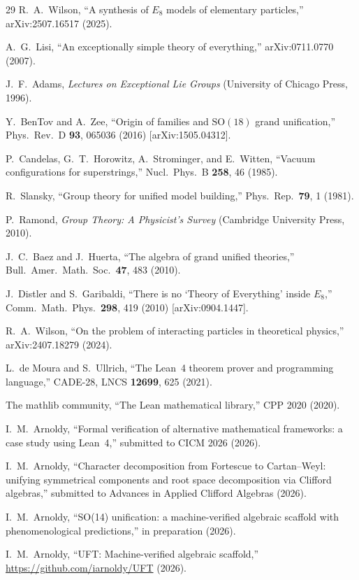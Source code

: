 \documentclass[aps,prl,twocolumn,showpacs,preprintnumbers,superscriptaddress,floatfix]{revtex4-2}
\begin{document}
\begin{thebibliography}{29}
R.~A.~Wilson,
``A synthesis of $E_8$ models of elementary particles,''
arXiv:2507.16517 (2025).

A.~G.~Lisi,
``An exceptionally simple theory of everything,''
arXiv:0711.0770 (2007).

J.~F.~Adams,
\textit{Lectures on Exceptional Lie Groups}
(University of Chicago Press, 1996).


Y.~BenTov and A.~Zee,
``Origin of families and $\mathrm{SO}(18)$ grand unification,''
Phys.\ Rev.\ D \textbf{93}, 065036 (2016)
[arXiv:1505.04312].

P.~Candelas, G.~T.~Horowitz, A.~Strominger, and E.~Witten,
``Vacuum configurations for superstrings,''
Nucl.\ Phys.\ B \textbf{258}, 46 (1985).


R.~Slansky,
``Group theory for unified model building,''
Phys.\ Rep.\ \textbf{79}, 1 (1981).

P.~Ramond,
\textit{Group Theory: A Physicist's Survey}
(Cambridge University Press, 2010).

J.~C.~Baez and J.~Huerta,
``The algebra of grand unified theories,''
Bull.\ Amer.\ Math.\ Soc.\ \textbf{47}, 483 (2010).

J.~Distler and S.~Garibaldi,
``There is no `Theory of Everything' inside $E_8$,''
Comm.\ Math.\ Phys.\ \textbf{298}, 419 (2010)
[arXiv:0904.1447].

R.~A.~Wilson,
``On the problem of interacting particles in theoretical physics,''
arXiv:2407.18279 (2024).


L.~de Moura and S.~Ullrich,
``The Lean~4 theorem prover and programming language,''
CADE-28, LNCS \textbf{12699}, 625 (2021).

The mathlib community,
``The Lean mathematical library,''
CPP 2020 (2020).


I.~M.~Arnoldy,
``Formal verification of alternative mathematical frameworks:
a case study using Lean~4,''
submitted to CICM 2026 (2026).

I.~M.~Arnoldy,
``Character decomposition from Fortescue to Cartan--Weyl:
unifying symmetrical components and root space decomposition
via Clifford algebras,''
submitted to Advances in Applied Clifford Algebras (2026).

I.~M.~Arnoldy,
``SO(14) unification: a machine-verified algebraic scaffold
with phenomenological predictions,''
in preparation (2026).

I.~M.~Arnoldy,
``UFT: Machine-verified algebraic scaffold,''
\url{https://github.com/iarnoldy/UFT} (2026).

\end{thebibliography}
\end{document}
